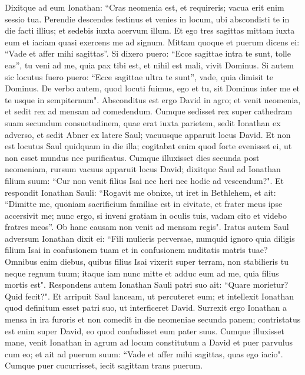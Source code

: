 \begin{biblechapter}
\verse Dixitque ad eum Ionathan: “Cras neomenia est, et requireris; 
\verse vacua erit enim sessio tua. Perendie descendes festinus et venies in locum, ubi abscondisti te in die facti illius; et sedebis iuxta acervum illum. 
\verse Et ego tres sagittas mittam iuxta eum et iaciam quasi exercens me ad signum. 
\verse Mittam quoque et puerum dicens ei: “Vade et affer mihi sagittas”. 
\verse Si dixero puero: “Ecce sagittae intra te sunt, tolle eas”, tu veni ad me, quia pax tibi est, et nihil est mali, vivit Dominus. Si autem sic locutus fuero puero: “Ecce sagittae ultra te sunt”, vade, quia dimisit te Dominus. 
\verse De verbo autem, quod locuti fuimus, ego et tu, sit Dominus inter me et te usque in sempiternum". 
\verse Absconditus est ergo David in agro; et venit neomenia, et sedit rex ad mensam ad comedendum. 
\verse Cumque sedisset rex super cathedram suam secundum consuetudinem, quae erat iuxta parietem, sedit Ionathan ex adverso, et sedit Abner ex latere Saul; vacuusque apparuit locus David. 
\verse Et non est locutus Saul quidquam in die illa; cogitabat enim quod forte evenisset ei, ut non esset mundus nec purificatus. 
\verse Cumque illuxisset dies secunda post neomeniam, rursum vacuus apparuit locus David; dixitque Saul ad Ionathan filium suum: “Cur non venit filius Isai nec heri nec hodie ad vescendum?". 
\verse Et respondit Ionathan Sauli: “Rogavit me obnixe, ut iret in Bethlehem, 
\verse et ait: “Dimitte me, quoniam sacrificium familiae est in civitate, et frater meus ipse accersivit me; nunc ergo, si inveni gratiam in oculis tuis, vadam cito et videbo fratres meos”. Ob hanc causam non venit ad mensam regis". 
\verse Iratus autem Saul adversum Ionathan dixit ei: “Fili mulieris perversae, numquid ignoro quia diligis filium Isai in confusionem tuam et in confusionem nuditatis matris tuae? 
\verse Omnibus enim diebus, quibus filius Isai vixerit super terram, non stabilieris tu neque regnum tuum; itaque iam nunc mitte et adduc eum ad me, quia filius mortis est". 
\verse Respondens autem Ionathan Sauli patri suo ait: “Quare morietur? Quid fecit?". 
\verse Et arripuit Saul lanceam, ut percuteret eum; et intellexit Ionathan quod definitum esset patri suo, ut interficeret David. 
\verse Surrexit ergo Ionathan a mensa in ira furoris et non comedit in die neomeniae secunda panem; contristatus est enim super David, eo quod confudisset eum pater suus. 
\verse Cumque illuxisset mane, venit Ionathan in agrum ad locum constitutum a David et puer parvulus cum eo; 
\verse et ait ad puerum suum: “Vade et affer mihi sagittas, quas ego iacio". Cumque puer cucurrisset, iecit sagittam trans puerum. 

\end{biblechapter}
